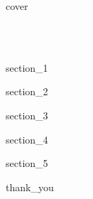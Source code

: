 {
{cover}
\begin{frame}
    \vspace{5cm}
    \textcolor{white}{Rogério Yamada \\ 22 September 2025}
\end{frame}
}

{
{section_1}
\begin{frame}[plain]
\end{frame}
}

{
{section_2}
\begin{frame}[plain]
\end{frame}
}

{
{section_3}
\begin{frame}[plain]
\end{frame}
}

{
{section_4}
\begin{frame}[plain]
\end{frame}
}

{
{section_5}
\begin{frame}[plain]
\end{frame}
}

{
{thank_you}
\begin{frame}[plain]
\end{frame}
}

